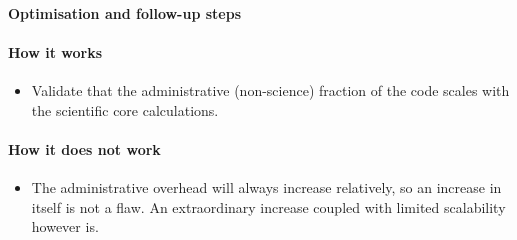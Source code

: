 \paragraph{Optimisation and follow-up steps}



\paragraph*{How it works}

\begin{itemize}[noitemsep]
  \item[$\boxplus$] Validate that the administrative (non-science) fraction of the code scales with the scientific core calculations.
\end{itemize}


\paragraph*{How it does not work}

\begin{itemize}[noitemsep]
  \item[$\boxminus$] The administrative overhead will always increase relatively, so an increase in itself is not a flaw. An extraordinary increase coupled with limited scalability however is.
\end{itemize}
